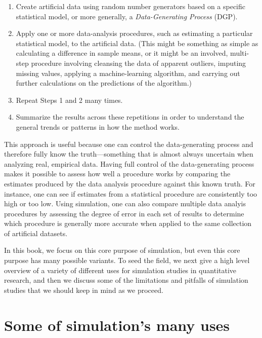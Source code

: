 \documentclass[
]{book}
\providecommand{\tightlist}{%
  \setlength{\itemsep}{0pt}\setlength{\parskip}{0pt}}
\begin{document}
\begin{enumerate}
\def\labelenumi{\arabic{enumi}.}
\tightlist
\item
  Create artificial data using random number generators based on a specific statistical model, or more generally, a \emph{Data-Generating Process} (DGP).
\item
  Apply one or more data-analysis procedures, such as estimating a particular statistical model, to the artificial data. (This might be something as simple as calculating a difference in sample means, or it might be an involved, multi-step procedure involving cleansing the data of apparent outliers, imputing missing values, applying a machine-learning algorithm, and carrying out further calculations on the predictions of the algorithm.)
\item
  Repeat Steps 1 and 2 many times.
\item
  Summarize the results across these repetitions in order to understand the general trends or patterns in how the method works.
\end{enumerate}

This approach is useful because one can control the data-generating process and therefore fully know the truth---something that is almost always uncertain when analyzing real, empirical data.
Having full control of the data-generating process makes it possible to assess how well a procedure works by comparing the estimates produced by the data analysis procedure against this known truth.
For instance, one can see if estimates from a statistical procedure are consistently too high or too low.
Using simulation, one can also compare multiple data analyis procedures by assessing the degree of error in each set of results to determine which procedure is generally more accurate when applied to the same collection of artificial datasets.

In this book, we focus on this core purpose of simulation, but even this core purpose has many possible variants.
To seed the field, we next give a high level overview of a variety of different uses for simulation studies in quantitative research, and then we discuss some of the limitations and pitfalls of simulation studies that we should keep in mind as we proceed.

\section{Some of simulation's many uses}\label{some-of-simulations-many-uses}
\end{document}
